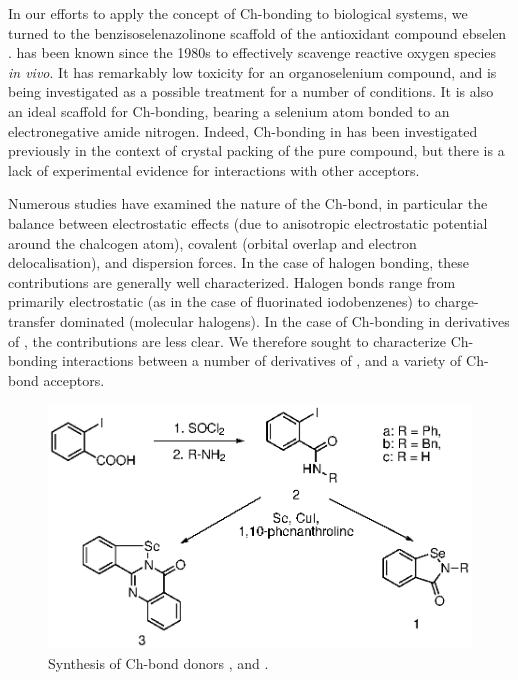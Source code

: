 In our efforts to apply the concept of Ch-bonding to biological systems, we turned to the benzisoselenazolinone scaffold of the antioxidant compound ebselen .
 has been known since the 1980s to effectively scavenge reactive oxygen species \emph{in vivo}.\autocite{Muller1984}
It has remarkably low toxicity for an organoselenium compound, and is being investigated as a possible treatment for a number of conditions.\autocite{Schewe1995,Kil2007,Singh2013,Parnham2000}
It is also an ideal scaffold for Ch-bonding, bearing a selenium atom bonded to an electronegative amide nitrogen.
Indeed, Ch-bonding in  has been investigated previously in the context of crystal packing of the pure compound, but there is a lack of experimental evidence for interactions with other acceptors.\autocite{Thomas2015}

Numerous studies have examined the nature of the Ch-bond, in particular the balance between electrostatic effects (due to anisotropic electrostatic potential around the chalcogen atom), covalent (orbital overlap and electron delocalisation), and dispersion forces.\autocite{Oliveira2017,Pascoe2017,DeVleeschouwer2017,Kolar2016,Gleiter2018}
In the case of halogen bonding, these contributions are generally well characterized.
Halogen bonds range from primarily electrostatic (as in the case of fluorinated iodobenzenes\autocite{Prasang2009}) to charge-transfer dominated (molecular halogens\autocite{Mulliken1950}).
In the case of Ch-bonding in derivatives of , the contributions are less clear.
We therefore sought to characterize Ch-bonding interactions between a number of derivatives of , and a variety of Ch-bond acceptors.

\begin{figure}
  \centering
  \includegraphics[scale=0.8]{fig/catalytic-synthesis.eps}
  \caption{Synthesis of Ch-bond donors ,  and .}
  \label{fig:synthesis}
\end{figure}

